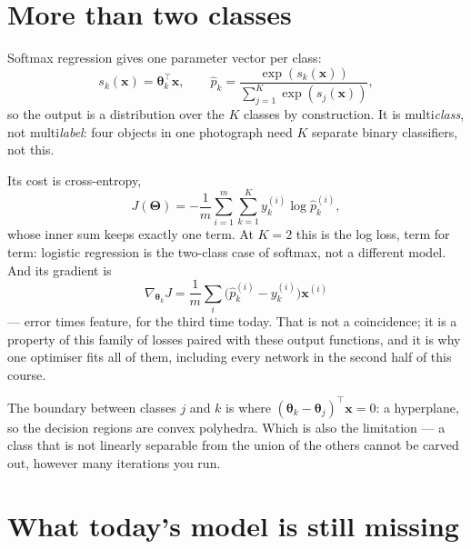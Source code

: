 \documentclass[11pt,a4paper]{article}
\begin{document}
\section{More than two classes}

Softmax regression gives one parameter vector per class:
\[ s_k(\mathbf{x}) = \boldsymbol\theta_k^{\intercal}\mathbf{x},
   \qquad
   \hat p_k = \frac{\exp(s_k(\mathbf{x}))}{\sum_{j=1}^{K}\exp(s_j(\mathbf{x}))}, \]
so the output is a distribution over the $K$ classes by construction. It is
multi\emph{class}, not multi\emph{label}: four objects in one photograph need
$K$ separate binary classifiers, not this.

Its cost is cross-entropy,
\[ J(\boldsymbol\Theta) = -\frac{1}{m}\sum_{i=1}^{m}\sum_{k=1}^{K}
   y_k^{(i)}\log\hat p_k^{(i)}, \]
whose inner sum keeps exactly one term. At $K = 2$ this is the log loss, term
for term: logistic regression is the two-class case of softmax, not a different
model. And its gradient is
\[ \nabla_{\boldsymbol\theta_k}J = \frac{1}{m}\sum_i
   \bigl(\hat p_k^{(i)} - y_k^{(i)}\bigr)\mathbf{x}^{(i)} \]
--- error times feature, for the third time today. That is not a coincidence;
it is a property of this family of losses paired with these output functions,
and it is why one optimiser fits all of them, including every network in the
second half of this course.

The boundary between classes $j$ and $k$ is where
$(\boldsymbol\theta_k - \boldsymbol\theta_j)^{\intercal}\mathbf{x} = 0$: a
hyperplane, so the decision regions are convex polyhedra. Which is also the
limitation --- a class that is not linearly separable from the union of the
others cannot be carved out, however many iterations you run.

\section{What today's model is still missing}
\end{document}
